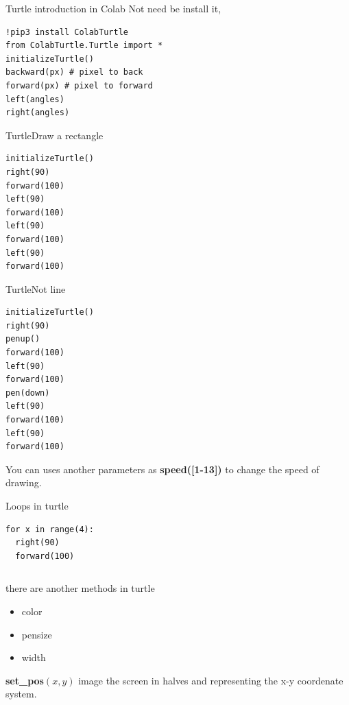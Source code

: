 \documentclass{beamer}
\begin{document}
\begin{frame}[fragile]{Turtle introduction in Colab}
Not need be install it,

\begin{lstlisting}
!pip3 install ColabTurtle
from ColabTurtle.Turtle import *
initializeTurtle()
backward(px) # pixel to back
forward(px) # pixel to forward
left(angles) 
right(angles)

\end{lstlisting}
\end{frame}


\begin{frame}[fragile]{Turtle}{Draw a rectangle}
\begin{lstlisting}
initializeTurtle()
right(90)
forward(100)
left(90)
forward(100)
left(90)
forward(100)
left(90)
forward(100)
\end{lstlisting}
\end{frame}


\begin{frame}[fragile]{Turtle}{Not line}
\begin{lstlisting}
initializeTurtle()
right(90)
penup()
forward(100)
left(90)
forward(100)
pen(down)
left(90)
forward(100)
left(90)
forward(100)
\end{lstlisting}
You can uses another parameters as \textbf{speed([1-13])} to change the speed of drawing.
\end{frame}



\begin{frame}[fragile]{Loops in turtle}

\begin{lstlisting}
for x in range(4):
  right(90)
  forward(100)
\end{lstlisting}


\begin{lstlisting}

\end{lstlisting}
\end{frame}


\begin{frame}
there are another methods in turtle
\begin{itemize}
\item color
\item pensize
\item width
\end{itemize}
\textbf{set\_pos$(x,y)$} image the screen in halves and representing the x-y coordenate system.
\end{frame}
\end{document}
